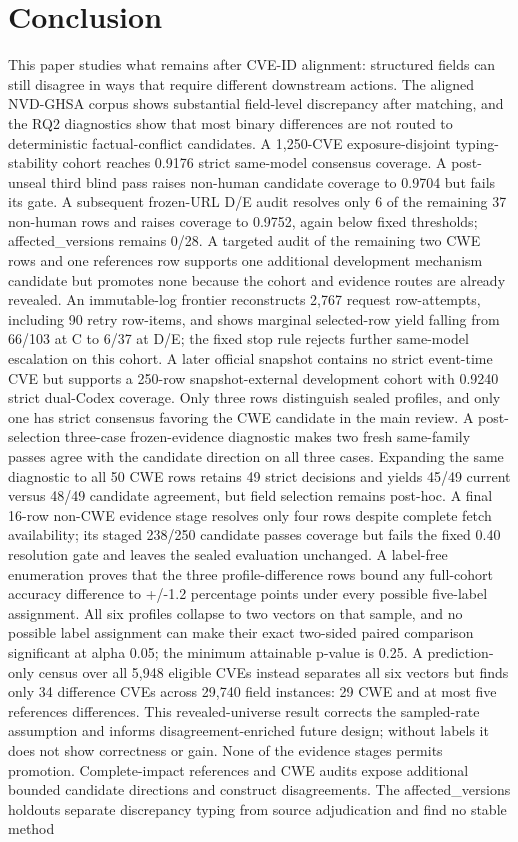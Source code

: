 \section{Conclusion}

This paper studies what remains after CVE-ID alignment: structured fields can still disagree in ways that require different downstream actions. The aligned NVD-GHSA corpus shows substantial field-level discrepancy after matching, and the RQ2 diagnostics show that most binary differences are not routed to deterministic factual-conflict candidates. A 1,250-CVE exposure-disjoint typing-stability cohort reaches 0.9176 strict same-model consensus coverage. A post-unseal third blind pass raises non-human candidate coverage to 0.9704 but fails its gate. A subsequent frozen-URL D/E audit resolves only 6 of the remaining 37 non-human rows and raises coverage to 0.9752, again below fixed thresholds; affected\_versions remains 0/28. A targeted audit of the remaining two CWE rows and one references row supports one additional development mechanism candidate but promotes none because the cohort and evidence routes are already revealed. An immutable-log frontier reconstructs 2,767 request row-attempts, including 90 retry row-items, and shows marginal selected-row yield falling from 66/103 at C to 6/37 at D/E; the fixed stop rule rejects further same-model escalation on this cohort. A later official snapshot contains no strict event-time CVE but supports a 250-row snapshot-external development cohort with 0.9240 strict dual-Codex coverage. Only three rows distinguish sealed profiles, and only one has strict consensus favoring the CWE candidate in the main review. A post-selection three-case frozen-evidence diagnostic makes two fresh same-family passes agree with the candidate direction on all three cases. Expanding the same diagnostic to all 50 CWE rows retains 49 strict decisions and yields 45/49 current versus 48/49 candidate agreement, but field selection remains post-hoc. A final 16-row non-CWE evidence stage resolves only four rows despite complete fetch availability; its staged 238/250 candidate passes coverage but fails the fixed 0.40 resolution gate and leaves the sealed evaluation unchanged. A label-free enumeration proves that the three profile-difference rows bound any full-cohort accuracy difference to +/-1.2 percentage points under every possible five-label assignment. All six profiles collapse to two vectors on that sample, and no possible label assignment can make their exact two-sided paired comparison significant at alpha 0.05; the minimum attainable p-value is 0.25. A prediction-only census over all 5,948 eligible CVEs instead separates all six vectors but finds only 34 difference CVEs across 29,740 field instances: 29 CWE and at most five references differences. This revealed-universe result corrects the sampled-rate assumption and informs disagreement-enriched future design; without labels it does not show correctness or gain. None of the evidence stages permits promotion. Complete-impact references and CWE audits expose additional bounded candidate directions and construct disagreements. The affected\_versions holdouts separate discrepancy typing from source adjudication and find no stable method 